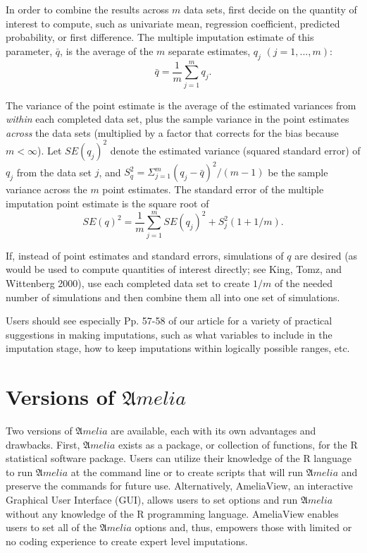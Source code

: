 \documentclass[12pt,titlepage]{article}
\newcommand{\Amelia}{\ensuremath{\mathfrak Amelia} }
\begin{document}
In order to combine the results across $m$ data sets, first decide on
the quantity of interest to compute, such as univariate mean,
regression coefficient, predicted probability, or first difference.
The multiple imputation estimate of this parameter, $\bar{q}$, is the
average of the $m$ separate estimates, $q_j$ $(j=1,...,m)$:
\begin{equation}
  \bar{q}=\frac{1}{m}\sum^{m}_{j=1}q_j.  
\end{equation}

The variance of the point estimate is the average of the estimated
variances from \emph{within} each completed data set, plus the sample
variance in the point estimates \emph{across} the data sets
(multiplied by a factor that corrects for the bias because
$m<\infty$).  Let $SE(q_j)^2$ denote the estimated variance (squared
standard error) of $q_j$ from the data set $j$, and
$S^{2}_{q}=\Sigma^{m}_{j=1}(q_j-\bar{q})^2/(m-1)$ be the sample
variance across the $m$ point estimates.  The standard error of the
multiple imputation point estimate is the square root of
\begin{equation}
SE(q)^2=\frac{1}{m}\sum^{m}_{j=1}SE(q_j)^2+S^{2}_{j}(1+1/m).
\end{equation}

If, instead of point estimates and standard errors, simulations of $q$
are desired (as would be used to compute quantities of interest
directly; see King, Tomz, and Wittenberg 2000), use each completed
data set to create $1/m$ of the needed number of simulations and then
combine them all into one set of simulations.

Users should see especially Pp. 57-58 of our article for a variety of
practical suggestions in making imputations, such as what variables to
include in the imputation stage, how to keep imputations within
logically possible ranges, etc.

\section{Versions of ${\mathfrak Amelia}$}
\label{sec:versions}
Two versions of \Amelia are available, each with its own advantages
and drawbacks.  First, \Amelia exists as a package, or collection of
functions, for the R statistical software package.  Users can utilize
their knowledge of the R language to run \Amelia at the command line
or to create scripts that will run \Amelia and preserve the commands
for future use.  Alternatively, AmeliaView, an interactive Graphical
User Interface (GUI), allows users to set options and run \Amelia
without any knowledge of the R programming language.  AmeliaView
enables users to set all of the \Amelia options and, thus, empowers
those with limited or no coding experience to create expert level
imputations.
\end{document}
